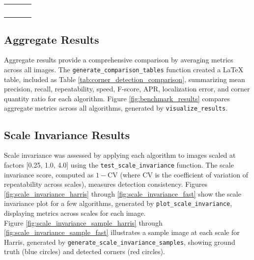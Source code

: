 \documentclass[journal]{IEEEtran}
\begin{document}
\begin{table}
{\begin{minipage}{0.47\textwidth}
\begin{tabular}{lp{3cm}cc}
    & & \\
    & & \\
    & & \\
    & & \\
    & & \\
    \bottomrule
    \end{tabular}
\end{minipage}
}
\end{table}

\subsection{Aggregate Results}
Aggregate results provide a comprehensive comparison by averaging metrics across all images. The \texttt{generate\_comparison\_tables} function created a LaTeX table, included as Table \ref{tab:corner_detection_comparison}, summarizing mean precision, recall, repeatability, speed, F-score, APR, localization error, and corner quantity ratio for each algorithm. Figure \ref{fig:benchmark_results} compares aggregate metrics across all algorithms, generated by \texttt{visualize\_results}.\\

\subsection{Scale Invariance Results}
Scale invariance was assessed by applying each algorithm to images scaled at factors [0.25, 1.0, 4.0] using the \texttt{test\_scale\_invariance} function. The scale invariance score, computed as \( 1 - \text{CV} \) (where CV is the coefficient of variation of repeatability across scales), measures detection consistency. Figures \ref{fig:scale_invariance_harris} through \ref{fig:scale_invariance_fast} show the scale invariance plot for a few algorithms, generated by \texttt{plot\_scale\_invariance}, displaying metrics across scales for each image.\\

Figure \ref{fig:scale_invariance_sample_harris} through \ref{fig:scale_invariance_sample_fast} illustrates a sample image at each scale for Harris, generated by \texttt{generate\_scale\_invariance\_samples}, showing ground truth (blue circles) and detected corners (red circles).\\
\end{document}
